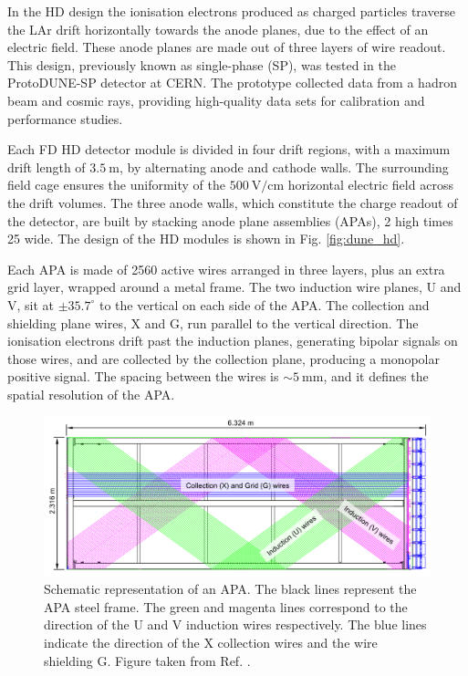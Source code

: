 In the HD design the ionisation electrons produced as charged particles traverse the LAr drift horizontally towards the anode planes, due to the effect of an electric field. These anode planes are made out of three layers of wire readout. This design, previously known as single-phase (SP), was tested in the ProtoDUNE-SP detector at CERN. The prototype collected data from a hadron beam and cosmic rays, providing high-quality data sets for calibration and performance studies.

Each FD HD detector module is divided in four drift regions, with a maximum drift length of $3.5~\mathrm{m}$, by alternating anode and cathode walls. The surrounding field cage ensures the uniformity of the $500~\mathrm{V/cm}$ horizontal electric field across the drift volumes. The three anode walls, which constitute the charge readout of the detector, are built by stacking anode plane assemblies (APAs), 2 high times 25 wide. The design of the HD modules is shown in Fig. \ref{fig:dune_hd}.

Each APA is made of 2560 active wires arranged in three layers, plus an extra grid layer, wrapped around a metal frame. The two induction wire planes, U and V, sit at $\pm 35.7^{\circ}$ to the vertical on each side of the APA. The collection and shielding plane wires, X and G, run parallel to the vertical direction. The ionisation electrons drift past the induction planes, generating bipolar signals on those wires, and are collected by the collection plane, producing a monopolar positive signal. The spacing between the wires is $\sim 5~\mathrm{mm}$, and it defines the spatial resolution of the APA.

\begin{figure}[t]
	\centering
	\includegraphics[width=1\linewidth]{Images/DUNE/FD/APA_wires}
	\caption[Schematic representation of an APA frames showing the U, V, X and G wires.]{Schematic representation of an APA. The black lines represent the APA steel frame. The green and magenta lines correspond to the direction of the U and V induction wires respectively. The blue lines indicate the direction of the X collection wires and the wire shielding G. Figure taken from Ref. \cite{DUNE2020TDR1}.}
	\label{fig:apa}
\end{figure}

